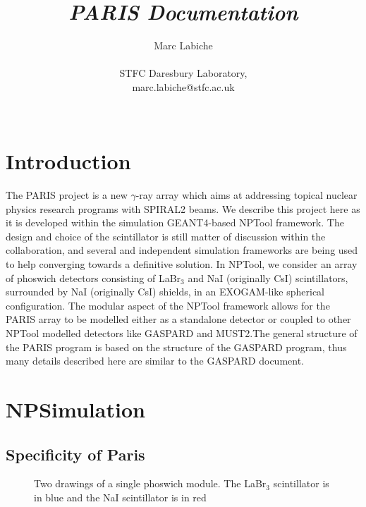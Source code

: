 \documentclass[a4paper,12pt]{article}
\begin{document}
\title{\emph{PARIS Documentation}}
\author{Marc Labiche\\ \\
 STFC Daresbury Laboratory,\\
 marc.labiche@stfc.ac.uk\\ \\} 
\maketitle 

\pagebreak
\tableofcontents
\pagebreak


\section{Introduction}
The PARIS project is a new $\gamma$-ray array which aims at addressing topical nuclear 
physics research programs with SPIRAL2 beams.
We describe this project here as it is developed within the simulation GEANT4-based 
NPTool framework. The design and choice of the scintillator is still matter of 
discussion within the collaboration, and several and independent simulation frameworks 
are being used to help converging towards a definitive solution. In NPTool, we consider 
an array of phoswich detectors consisting of LaBr$_{3}$ and NaI (originally CsI) 
scintillators, surrounded by NaI (originally CsI) shields, in an EXOGAM-like spherical 
configuration. The modular 
aspect of the NPTool framework allows for the PARIS array to be modelled either as a 
standalone detector or coupled to other NPTool modelled detectors like GASPARD and 
MUST2.The general structure of the PARIS program is based on the structure of the 
GASPARD program, thus many details described here are similar to the GASPARD document.

\section{NPSimulation}
\subsection{Specificity of Paris}

\begin{figure*}[ht]
\begin{center}
\end{center}
\caption{Two drawings of a single phoswich module. The LaBr$_{3}$ scintillator is in blue 
and the NaI scintillator is in red } 
\label{fig:phoswich1}
\end{figure*}
\end{document}
